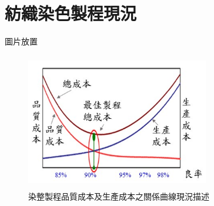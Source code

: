 \chapter{紡織染色製程現況}
\label{c:description}
圖片放置
\begin{figure} 
\centering  
\includegraphics[width=8cm,height=6cm]{Graph/graph1.png}
\caption{染整製程品質成本及生產成本之關係曲線現況描述}
\label{fig:graph1}
\end{figure}